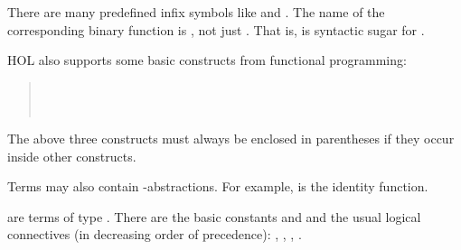 \begin{isabellebody}
\begin{isamarkuptext}
\begin{warn}
There are many predefined infix symbols like  and .
The name of the corresponding binary function is ,
not just . That is,  is syntactic sugar for
.
\end{warn}

HOL also supports some basic constructs from functional programming:
\begin{quote}
\\
\\
\end{quote}
\begin{warn}
The above three constructs must always be enclosed in parentheses
if they occur inside other constructs.
\end{warn}
Terms may also contain -abstractions. For example,
 is the identity function.

 are terms of type .
There are the basic constants  and  and
the usual logical connectives (in decreasing order of precedence):
, , , .


\end{isamarkuptext}
\end{isabellebody}
